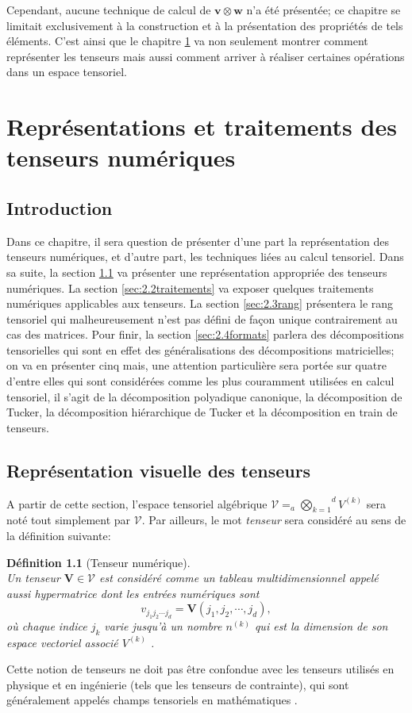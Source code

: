\documentclass[11pt,a4paper,oneside]{book}
\newtheorem{defi}{Définition}[chapter]
\def\V{\mathcal V}
\def\vey{\mathbf V}
\def\agktensor{_{a}\overset{d}{\underset{k=1}{\bigotimes}}}
\def\v{\mathbf v}
\def\w{\mathbf w}
\begin{document}
Cependant, aucune technique de calcul de $ \v\otimes \w$ n'a été présentée; ce chapitre se limitait exclusivement à la construction et à la présentation des propriétés de tels éléments. C'est ainsi que le chapitre \ref{chap2} va non seulement montrer comment représenter les tenseurs mais aussi comment arriver à réaliser certaines opérations dans un espace tensoriel.


\chapter{Représentations et traitements des tenseurs numériques}\label{chap2}

\section*{Introduction}
 Dans ce chapitre, il sera question de présenter d'une part la représentation des tenseurs numériques, et d'autre part, les techniques liées au calcul tensoriel. Dans sa suite, la section \ref{sec:2.1visual} va présenter une représentation appropriée des tenseurs numériques. La section \ref{sec:2.2traitements} va exposer quelques traitements numériques applicables aux tenseurs. La section \ref{sec:2.3rang} présentera le rang tensoriel qui malheureusement n'est pas défini de façon unique contrairement au cas des matrices. Pour finir, la section \ref{sec:2.4formats} parlera des décompositions tensorielles qui sont en effet des généralisations des décompositions matricielles; on va en présenter cinq mais, une attention particulière sera portée  sur quatre d'entre elles qui sont considérées comme les plus couramment utilisées en calcul tensoriel, il s'agit de la décomposition polyadique canonique, la décomposition de Tucker, la décomposition hiérarchique de Tucker et la décomposition en train de tenseurs.
\section{Représentation visuelle des tenseurs}\label{sec:2.1visual}
A partir de cette section, l'espace tensoriel algébrique  $ \V=\agktensor V^{(k)}$ sera noté tout simplement par $ \V $. Par ailleurs, le mot \textit{tenseur} sera considéré au sens de la définition suivante:
\begin{defi}[Tenseur numérique]\label{tensornum}
	\emph{\\}
	Un tenseur $ \vey\in\V$ est considéré comme un tableau multidimensionnel appelé aussi hypermatrice dont les entrées numériques sont 
	\begin{equation*}
	v_{j_{1}j_{2}\cdots j_{d}}=\vey\left(j_{1},j_{2},\cdots,j_{d}\right),
	\end{equation*}
	où chaque indice $ j_{k} $ varie jusqu'à un nombre $ n^{(k)} $ qui est la dimension de son espace vectoriel associé $ V^{(k)}$ \cite[p.124]{Nyenyezi2018}.
\end{defi} 
Cette notion de tenseurs ne doit pas être confondue avec les tenseurs utilisés en physique et en ingénierie (tels que les tenseurs de contrainte), qui sont généralement appelés champs tensoriels en mathématiques \cite[p.455]{Hong2008}.\\
\end{document}
